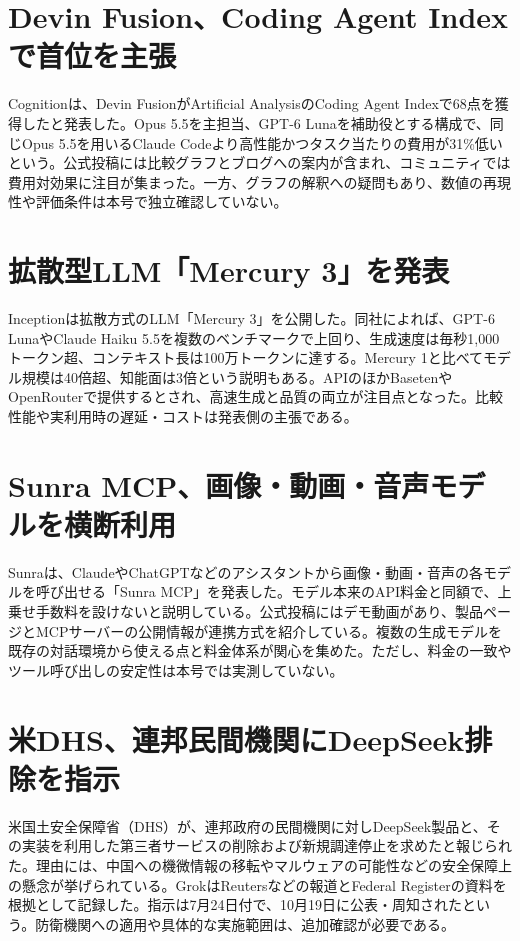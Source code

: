 \section{Devin Fusion、Coding Agent Indexで首位を主張}
Cognitionは、Devin FusionがArtificial AnalysisのCoding Agent Indexで68点を獲得したと発表した。Opus 5.5を主担当、GPT-6 Lunaを補助役とする構成で、同じOpus 5.5を用いるClaude Codeより高性能かつタスク当たりの費用が31\%低いという。公式投稿には比較グラフとブログへの案内が含まれ、コミュニティでは費用対効果に注目が集まった。一方、グラフの解釈への疑問もあり、数値の再現性や評価条件は本号で独立確認していない。

\section{拡散型LLM「Mercury 3」を発表}
Inceptionは拡散方式のLLM「Mercury 3」を公開した。同社によれば、GPT-6 LunaやClaude Haiku 5.5を複数のベンチマークで上回り、生成速度は毎秒1,000トークン超、コンテキスト長は100万トークンに達する。Mercury 1と比べてモデル規模は40倍超、知能面は3倍という説明もある。APIのほかBasetenやOpenRouterで提供するとされ、高速生成と品質の両立が注目点となった。比較性能や実利用時の遅延・コストは発表側の主張である。

\section{Sunra MCP、画像・動画・音声モデルを横断利用}
Sunraは、ClaudeやChatGPTなどのアシスタントから画像・動画・音声の各モデルを呼び出せる「Sunra MCP」を発表した。モデル本来のAPI料金と同額で、上乗せ手数料を設けないと説明している。公式投稿にはデモ動画があり、製品ページとMCPサーバーの公開情報が連携方式を紹介している。複数の生成モデルを既存の対話環境から使える点と料金体系が関心を集めた。ただし、料金の一致やツール呼び出しの安定性は本号では実測していない。

\section{米DHS、連邦民間機関にDeepSeek排除を指示}
米国土安全保障省（DHS）が、連邦政府の民間機関に対しDeepSeek製品と、その実装を利用した第三者サービスの削除および新規調達停止を求めたと報じられた。理由には、中国への機微情報の移転やマルウェアの可能性などの安全保障上の懸念が挙げられている。GrokはReutersなどの報道とFederal Registerの資料を根拠として記録した。指示は7月24日付で、10月19日に公表・周知されたという。防衛機関への適用や具体的な実施範囲は、追加確認が必要である。

